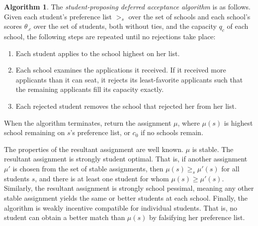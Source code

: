 \documentclass[12pt]{article}
\theoremstyle{definition}
\newtheorem{algorithm}{Algorithm}
\begin{document}
\begin{algorithm}
The \emph{student-proposing deferred acceptance algorithm} is as follows. Given each student's preference list $>_s$ over the set of schools and each school's scores $\theta_{.c}$ over the set of students, both without ties, and the capacity $q_c$ of each school, the following steps are repeated until no rejections take place:
\begin{enumerate}
\item Each student applies to the school highest on her list.
\item Each school examines the applications it received. If it received more applicants than it can seat, it rejects its least-favorite applicants such that the remaining applicants fill its capacity exactly.
\item Each rejected student removes the school that rejected her from her list.
\end{enumerate}
When the algorithm terminates, return the assignment $\mu$, where $\mu(s)$ is highest school remaining on $s$'s preference list, or $c_0$ if no schools remain. 
\end{algorithm}
The properties of the resultant assignment are well known. $\mu$ is stable. The resultant assignment is strongly student optimal. That is, if another assignment $\mu'$ is chosen from the set of stable assignments, then $\mu(s) \geq_s \mu'(s)$ for all students $s$, and there is at least one student for whom $\mu(s) \geq \mu'(s)$. Similarly, the resultant assignment is strongly school pessimal, meaning any other stable assignment yields the same or better students at each school. Finally, the algorithm is weakly incentive compatible for individual students. That is, no student can obtain a better match than $\mu(s)$ by falsifying her preference list. %
\end{document}

